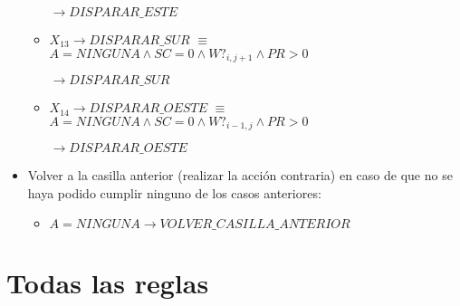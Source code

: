 \begin{itemize}
\begin{itemize}
            $\longrightarrow DISPARAR\_ESTE$
            
            \item $X_{13} \longrightarrow DISPARAR\_SUR$
            $\equiv$
            \newline
            $A = NINGUNA \land SC = 0 \land W?_{i, j+1} \land PR > 0$ 
            
            $\longrightarrow DISPARAR\_SUR$
            
            \item $X_{14} \longrightarrow DISPARAR\_OESTE$
            $\equiv$
            \newline
            $A = NINGUNA \land SC = 0 \land W?_{i-1, j} \land PR > 0$ 
            
            $\longrightarrow DISPARAR\_OESTE$
        \end{itemize}
    
    \item Volver a la casilla anterior (realizar la acción contraria) en caso de que no se haya podido cumplir ninguno de los casos anteriores:
        \begin{itemize}
            \item $A = NINGUNA \longrightarrow VOLVER\_CASILLA\_ANTERIOR$
        \end{itemize}
\end{itemize}

\newpage
\section{Todas las reglas}

